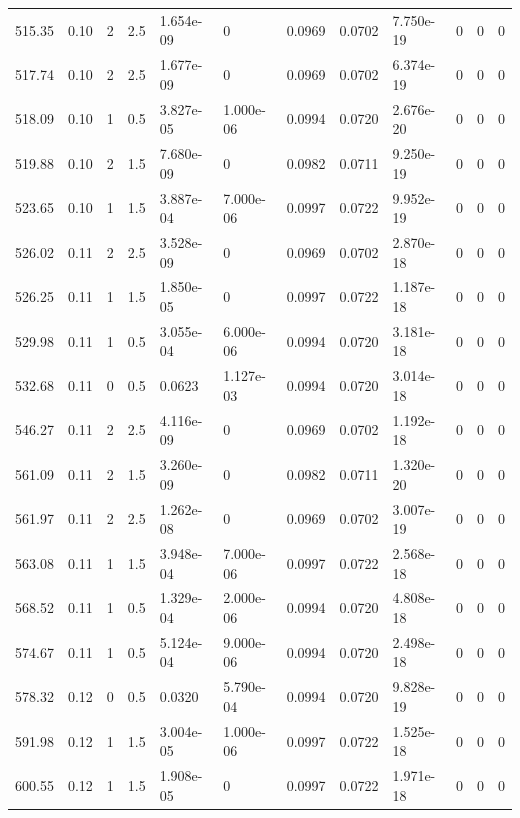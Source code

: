 \documentclass[preview]{standalone}
\begin{document}
{{{\begin{tabular}{L{1.2cm}C{1.2cm} C{0.3cm}C{0.5cm} C{1.4cm}C{1.4cm} C{1.4cm}C{1.4cm} C{1.6cm}C{1.6cm} C{1.6cm}C{1.6cm}}
  515.35  &  0.10  & 2     & 2.5 &  1.654e-09  & 0  &  0.0969&   0.0702& 7.750e-19 & 0   &  0 & 0  \\ 
  517.74  &  0.10  & 2     & 2.5 &  1.677e-09  & 0  &  0.0969&   0.0702& 6.374e-19 & 0   &  0 & 0  \\ 
  518.09  &  0.10  & 1     & 0.5 &  3.827e-05  & 1.000e-06  &  0.0994&   0.0720& 2.676e-20 & 0   &  0 & 0  \\ 
  519.88  &  0.10  & 2     & 1.5 &  7.680e-09  & 0  &  0.0982&   0.0711& 9.250e-19 & 0   &  0 & 0  \\ 
  523.65  &  0.10  & 1     & 1.5 &  3.887e-04  & 7.000e-06  &  0.0997&   0.0722& 9.952e-19 & 0   &  0 & 0  \\ 
  526.02  &  0.11  & 2     & 2.5 &  3.528e-09  & 0  &  0.0969&   0.0702& 2.870e-18 & 0   &  0 & 0  \\ 
  526.25  &  0.11  & 1     & 1.5 &  1.850e-05  & 0  &  0.0997&   0.0722& 1.187e-18 & 0   &  0 & 0  \\ 
  529.98  &  0.11  & 1     & 0.5 &  3.055e-04  & 6.000e-06  &  0.0994&   0.0720& 3.181e-18 & 0   &  0 & 0  \\ 
  532.68  &  0.11  & 0     & 0.5 &  0.0623  & 1.127e-03  &  0.0994&   0.0720& 3.014e-18 & 0   &  0 & 0  \\ 
  546.27  &  0.11  & 2     & 2.5 &  4.116e-09  & 0  &  0.0969&   0.0702& 1.192e-18 & 0   &  0 & 0  \\ 
  561.09  &  0.11  & 2     & 1.5 &  3.260e-09  & 0  &  0.0982&   0.0711& 1.320e-20 & 0   &  0 & 0  \\ 
  561.97  &  0.11  & 2     & 2.5 &  1.262e-08  & 0  &  0.0969&   0.0702& 3.007e-19 & 0   &  0 & 0  \\ 
  563.08  &  0.11  & 1     & 1.5 &  3.948e-04  & 7.000e-06  &  0.0997&   0.0722& 2.568e-18 & 0   &  0 & 0  \\ 
  568.52  &  0.11  & 1     & 0.5 &  1.329e-04  & 2.000e-06  &  0.0994&   0.0720& 4.808e-18 & 0   &  0 & 0  \\ 
  574.67  &  0.11  & 1     & 0.5 &  5.124e-04  & 9.000e-06  &  0.0994&   0.0720& 2.498e-18 & 0   &  0 & 0  \\ 
  578.32  &  0.12  & 0     & 0.5 &  0.0320  & 5.790e-04  &  0.0994&   0.0720& 9.828e-19 & 0   &  0 & 0  \\ 
  591.98  &  0.12  & 1     & 1.5 &  3.004e-05  & 1.000e-06  &  0.0997&   0.0722& 1.525e-18 & 0   &  0 & 0  \\ 
  600.55  &  0.12  & 1     & 1.5 &  1.908e-05  & 0  &  0.0997&   0.0722& 1.971e-18 & 0   &  0 & 0  \\ 

\end{tabular}}}}
\end{document}
